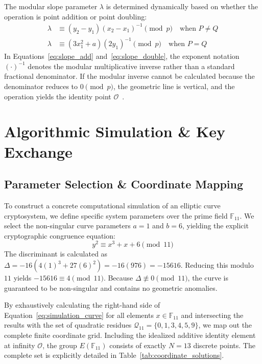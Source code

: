 \documentclass[11pt,a4paper]{article}
\begin{document}
The modular slope parameter $\lambda$ is determined dynamically based on whether the operation is point addition or point doubling:
\begin{align}
    \lambda &\equiv (y_2 - y_1)(x_2 - x_1)^{-1} \pmod{p} \quad \text{when } P \neq Q \label{eq:slope_add} \\
    \lambda &\equiv (3x_1^2 + a)(2y_1)^{-1} \pmod{p} \quad \text{when } P = Q \label{eq:slope_double}
\end{align}
In Equations~\ref{eq:slope_add} and~\ref{eq:slope_double}, the exponent notation $(\cdot)^{-1}$ denotes the modular multiplicative inverse rather than a standard fractional denominator. If the modular inverse cannot be calculated because the denominator reduces to $0 \pmod{p}$, the geometric line is vertical, and the operation yields the identity point $\mathcal{O}$~\cite{hoffstein}.

\section{Algorithmic Simulation \& Key Exchange}
\label{sec:simulation}

\subsection{Parameter Selection \& Coordinate Mapping}
\label{subsec:mapping}
To construct a concrete computational simulation of an elliptic curve cryptosystem, we define specific system parameters over the prime field $\mathbb{F}_{11}$. We select the non-singular curve parameters $a = 1$ and $b = 6$, yielding the explicit cryptographic congruence equation:
\begin{equation}
    y^2 \equiv x^3 + x + 6 \pmod{11}
    \label{eq:simulation_curve}
\end{equation}
The discriminant is calculated as $\Delta = -16(4(1)^3 + 27(6)^2) = -16(976) = -15616$. Reducing this modulo $11$ yields $-15616 \equiv 4 \pmod{11}$. Because $\Delta \not\equiv 0 \pmod{11}$, the curve is guaranteed to be non-singular and contains no geometric anomalies.

By exhaustively calculating the right-hand side of Equation~\ref{eq:simulation_curve} for all elements $x \in \mathbb{F}_{11}$ and intersecting the results with the set of quadratic residues $\mathcal{Q}_{11} = \{0, 1, 3, 4, 5, 9\}$, we map out the complete finite coordinate grid. Including the idealized additive identity element at infinity $\mathcal{O}$, the group $E(\mathbb{F}_{11})$ consists of exactly $N = 13$ discrete points. The complete set is explicitly detailed in Table~\ref{tab:coordinate_solutions}.
\end{document}
